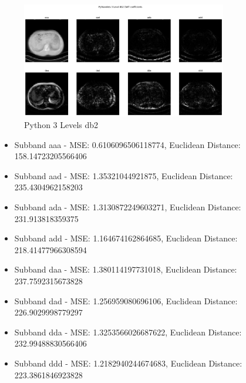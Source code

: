 \documentclass{article}
\begin{document}
\begin{figure}[H]
    \centering
    \includegraphics[width=0.8\textwidth]{assets/py-3-db2.png}
    \caption{Python 3 Levels db2}
    \label{fig16}
\end{figure}

\begin{itemize}
    \item Subband aaa - MSE: 0.6106096506118774, Euclidean Distance: 158.14723205566406
    \item Subband aad - MSE: 1.35321044921875, Euclidean Distance: 235.4304962158203
    \item Subband ada - MSE: 1.3130872249603271, Euclidean Distance: 231.913818359375
    \item Subband add - MSE: 1.164674162864685, Euclidean Distance: 218.41477966308594
    \item Subband daa - MSE: 1.380114197731018, Euclidean Distance: 237.7592315673828
    \item Subband dad - MSE: 1.256959080696106, Euclidean Distance: 226.9029998779297
    \item Subband dda - MSE: 1.3253566026687622, Euclidean Distance: 232.99488830566406
    \item Subband ddd - MSE: 1.2182940244674683, Euclidean Distance: 223.3861846923828
\end{itemize}

\pagebreak



\end{document}
